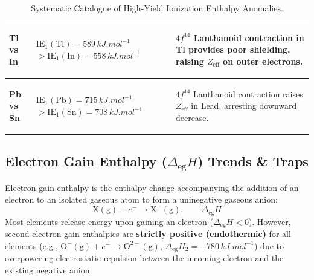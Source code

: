 \documentclass[10pt,twoside,openright]{book}
\begin{document}
\begin{table}[htbp]
\begin{tabularx}{\textwidth}{>{\bfseries\raggedright\arraybackslash}p{2.0cm} p{2.8cm} X}
\midrule
\textbf{Tl vs In} & $\text{IE}_1(\mathrm{Tl}) = 589\,\si{kJ.mol^{-1}}$ \newline $> \text{IE}_1(\mathrm{In}) = 558\,\si{kJ.mol^{-1}}$ & $4f^{14}$ Lanthanoid contraction in Tl provides poor shielding, raising $Z_{\text{eff}}$ on outer electrons. \\
\midrule
\textbf{Pb vs Sn} & $\text{IE}_1(\mathrm{Pb}) = 715\,\si{kJ.mol^{-1}}$ \newline $> \text{IE}_1(\mathrm{Sn}) = 708\,\si{kJ.mol^{-1}}$ & $4f^{14}$ Lanthanoid contraction raises $Z_{\text{eff}}$ in Lead, arresting downward decrease. \\
\bottomrule
\end{tabularx}
\caption{Systematic Catalogue of High-Yield Ionization Enthalpy Anomalies.}
\end{table}

\subsection{Electron Gain Enthalpy ($\Delta_{\text{eg}} H$) Trends \& Traps}
Electron gain enthalpy is the enthalpy change accompanying the addition of an electron to an isolated gaseous atom to form a uninegative gaseous anion:
\begin{equation}
  \mathrm{X(g)} + e^- \longrightarrow \mathrm{X^-(g)}, \qquad \Delta_{\text{eg}} H
\end{equation}
Most elements release energy upon gaining an electron ($\Delta_{\text{eg}} H < 0$). However, second electron gain enthalpies are \textbf{strictly positive (endothermic)} for all elements (e.g., $\mathrm{O^-(g)} + e^- \to \mathrm{O^{2-}(g)}$, $\Delta_{\text{eg}} H_2 = +780\,\si{kJ.mol^{-1}}$) due to overpowering electrostatic repulsion between the incoming electron and the existing negative anion.
\end{document}
